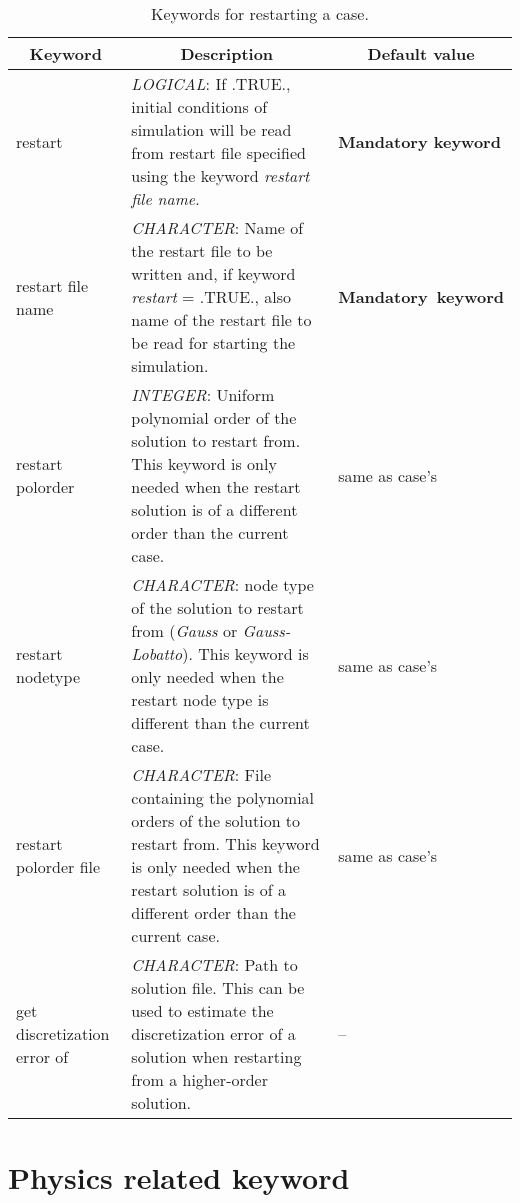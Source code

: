 \documentclass[a4paper,10pt]{report}
\begin{document}
\begin{table}[htbp]
\caption{Keywords for restarting a case.}
\begin{tabular}{|l|p{10cm}|p{2.2cm}|}
\hline
\multicolumn{1}{|c|}{Keyword} & \multicolumn{1}{c|}{Description} & \multicolumn{1}{c|}{Default value} \\ \hline

restart 			& \textit{LOGICAL}: If .TRUE., initial conditions of simulation will be read from restart file specified using the keyword \textit{restart file name}. & \textbf{Mandatory keyword} \\ \hline

restart file name   & \textit{CHARACTER}: Name of the restart file to be written and, if keyword \textit{restart} = .TRUE., also name of the restart file to be read for starting the simulation. & \textbf{Mandatory\ keyword} \\ \hline

restart polorder & \textit{INTEGER}: Uniform polynomial order of the solution to restart from. This keyword is only needed when the restart solution is of a different order than the current case. & same as case's \\ \hline

restart nodetype & \textit{CHARACTER}: node type of the solution to restart from (\emph{Gauss} or \emph{Gauss-Lobatto}). This keyword is only needed when the restart node type is different than the current case. & same as case's \\ \hline

restart polorder file &
			\textit{CHARACTER}: File containing the polynomial orders of the solution to restart from. This keyword is only needed when the restart solution is of a different order than the current case.  &  same as case's\\ \hline

get discretization error of & \textit{CHARACTER}: Path to solution file. This can be used to estimate the discretization error of a solution when restarting from a higher-order solution. & -- \\ \hline

\end{tabular}
\label{tab:restartkey}
\end{table}


\chapter{Physics related keyword}
\end{document}
